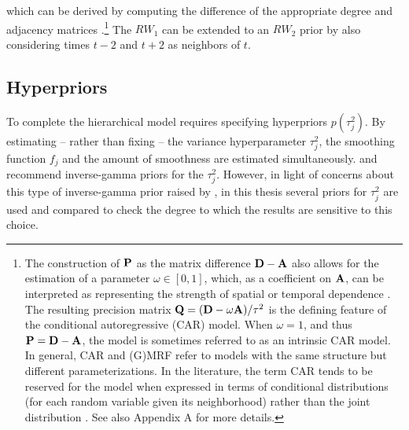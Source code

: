 \noindent which can be derived by computing the difference of the appropriate degree 
and adjacency matrices .\footnote{The construction 
of $\mathbf{P}$ as the matrix difference $\mathbf{D} - \mathbf{A}$ also allows for the estimation 
of a parameter $\omega \in [0,1]$, which, as a coefficient on $\mathbf{A}$, can be 
interpreted as representing the strength of spatial or temporal dependence 
. The resulting precision matrix 
$\mathbf{Q}= (\mathbf{D} - \omega \mathbf{A})/\tau^2$ is the defining feature of the conditional 
autoregressive (CAR) model.  When $\omega = 1$, and thus $\mathbf{P}= \mathbf{D} - \mathbf{A}$, 
the model is sometimes referred to as an intrinsic CAR model. In general, CAR and (G)MRF 
refer to models with the same structure but different parameterizations. In the literature, the 
term CAR tends to be reserved for the model when expressed in terms of conditional 
distributions (for each random variable given its neighborhood) rather than the joint distribution . 
See also Appendix A %
for more details.\label{footnote_car}} 
The $RW_1$ can be extended to an $RW_2$ prior by also considering  
times $t-2$ and $t+2$ as neighbors of $t$. 


\subsection{Hyperpriors}
\label{hyperpriors}

To complete the hierarchical model requires specifying hyperpriors $p(\tau_j^2)$.  
By estimating -- rather than fixing -- the variance hyperparameter $\tau_j^2$, the smoothing 
function $f_j$ and the amount of smoothness are estimated simultaneously. 
 and  recommend  
inverse-gamma priors for the $\tau_j^2$. However, in light of concerns about this type 
of inverse-gamma prior raised by , in this thesis several priors 
for $\tau^2_j$ are used and compared to check the degree to which the results are 
sensitive to this choice.

